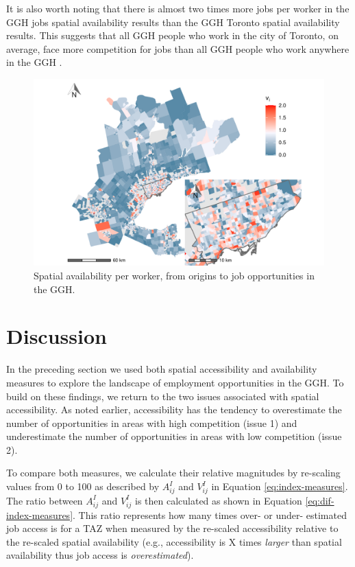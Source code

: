 \documentclass[]{elsarticle} %
\begin{document}
It is also worth noting that there is almost two times more jobs per
worker in the GGH jobs spatial availability results than the GGH Toronto
spatial availability results. This suggests that all GGH people who work
in the city of Toronto, on average, face more competition for jobs than
all GGH people who work anywhere in the GGH .

\begin{figure}
\includegraphics[width=1\linewidth]{Spatial-Availability_files/figure-latex/plot-avail-GGH-TTS-per-worker-1} \caption{\label{fig:plot-avail-GGH-TTS-per-worker}Spatial availability per worker, from origins to job opportunities in the GGH.}\label{fig:plot-avail-GGH-TTS-per-worker}
\end{figure}

\newpage

\hypertarget{discussion}{%
\section{Discussion}\label{discussion}}

In the preceding section we used both spatial accessibility and
availability measures to explore the landscape of employment
opportunities in the GGH. To build on these findings, we return to the
two issues associated with spatial accessibility. As noted earlier,
accessibility has the tendency to overestimate the number of
opportunities in areas with high competition (issue 1) and underestimate
the number of opportunities in areas with low competition (issue 2).

To compare both measures, we calculate their relative magnitudes by
re-scaling values from 0 to 100 as described by \(A^I_{ij}\) and
\(V^I_{ij}\) in Equation \ref{eq:index-measures}. The ratio between
\(A^I_{ij}\) and \(V^I_{ij}\) is then calculated as shown in Equation
\ref{eq:dif-index-measures}. This ratio represents how many times over-
or under- estimated job access is for a TAZ when measured by the
re-scaled accessibility relative to the re-scaled spatial availability
(e.g., accessibility is X times \emph{larger} than spatial availability
thus job access is \emph{overestimated}).
\end{document}
